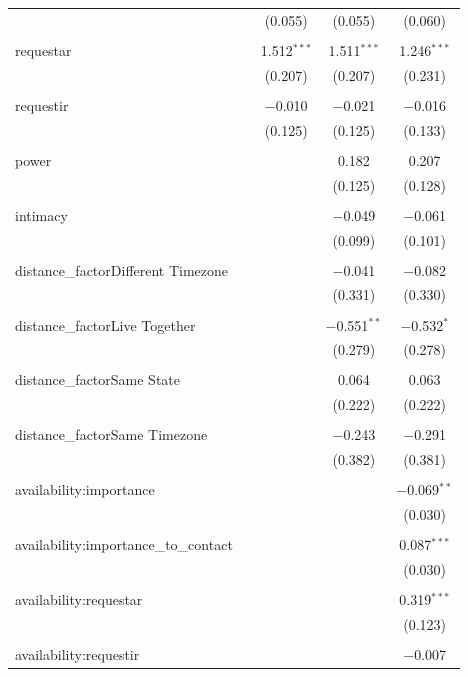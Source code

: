 \documentclass[12pt]{nuthesis}	%
\begin{document}
\begin{table}[!htbp]
\begin{tabular}{@{\extracolsep{5pt}}lcccc}
  &  & (0.055) & (0.055) & (0.060) \\ 
  & & & & \\ 
 requestar &  & 1.512$^{***}$ & 1.511$^{***}$ & 1.246$^{***}$ \\ 
  &  & (0.207) & (0.207) & (0.231) \\ 
  & & & & \\ 
 requestir &  & $-$0.010 & $-$0.021 & $-$0.016 \\ 
  &  & (0.125) & (0.125) & (0.133) \\ 
  & & & & \\ 
 power &  &  & 0.182 & 0.207 \\ 
  &  &  & (0.125) & (0.128) \\ 
  & & & & \\ 
 intimacy &  &  & $-$0.049 & $-$0.061 \\ 
  &  &  & (0.099) & (0.101) \\ 
  & & & & \\ 
 distance\_factorDifferent Timezone &  &  & $-$0.041 & $-$0.082 \\ 
  &  &  & (0.331) & (0.330) \\ 
  & & & & \\ 
 distance\_factorLive Together &  &  & $-$0.551$^{**}$ & $-$0.532$^{*}$ \\ 
  &  &  & (0.279) & (0.278) \\ 
  & & & & \\ 
 distance\_factorSame State &  &  & 0.064 & 0.063 \\ 
  &  &  & (0.222) & (0.222) \\ 
  & & & & \\ 
 distance\_factorSame Timezone &  &  & $-$0.243 & $-$0.291 \\ 
  &  &  & (0.382) & (0.381) \\ 
  & & & & \\ 
 availability:importance &  &  &  & $-$0.069$^{**}$ \\ 
  &  &  &  & (0.030) \\ 
  & & & & \\ 
 availability:importance\_to\_contact &  &  &  & 0.087$^{***}$ \\ 
  &  &  &  & (0.030) \\ 
  & & & & \\ 
 availability:requestar &  &  &  & 0.319$^{***}$ \\ 
  &  &  &  & (0.123) \\ 
  & & & & \\ 
 availability:requestir &  &  &  & $-$0.007 \\ 

\end{tabular}
\end{table}
\end{document}
